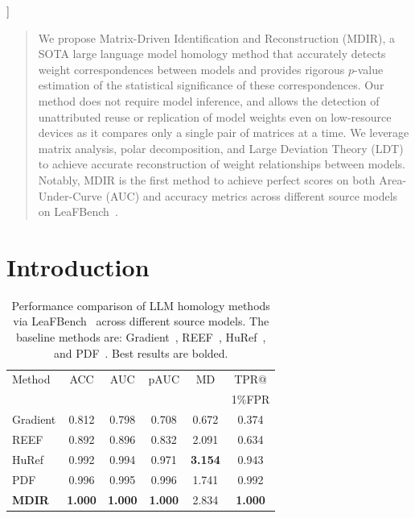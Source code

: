 \documentclass{article} %
\begin{document}
  \vskip 0.3in
]
\printAffiliationsAndNotice{}

\begin{abstract}
We propose Matrix-Driven Identification and Reconstruction (MDIR), a SOTA large language model homology method that accurately detects weight correspondences between models and provides rigorous $p$-value estimation of the statistical significance of these correspondences. Our method does not require model inference, and allows the detection of unattributed reuse or replication of model weights even on low-resource devices as it compares only a single pair of matrices at a time. We leverage matrix analysis, polar decomposition, and Large Deviation Theory (LDT) to achieve accurate reconstruction of weight relationships between models. Notably, MDIR is the first method to achieve perfect scores on both Area-Under-Curve (AUC) and accuracy metrics across different source models on LeaFBench~\citep{shao2025soklargelanguagemodel}.

\end{abstract}

\section{Introduction}

\begin{table}[h]
\centering
\caption{Performance comparison of LLM homology methods via LeaFBench~\citep{shao2025soklargelanguagemodel} across different source models. The baseline methods are: Gradient~\citep{wu2025gradientbasedmodelfingerprintingllm},  REEF~\citep{zhang2025reef}, HuRef~\citep{zeng2024huref}, and PDF~\citep{yoon2025intrinsicfingerprintllmscontinue}. Best results are bolded.}
\begin{adjustbox}{max width=1.0\columnwidth}
\begin{tabular}{lccccc}
\hline
Method & ACC & AUC  & pAUC & MD  & TPR@ \\
 &   &  &   &  & 1\%FPR \\
\hline
Gradient & 0.812 & 0.798 & 0.708 & 0.672 & 0.374 \\
REEF & 0.892 & 0.896 & 0.832 & 2.091 & 0.634 \\
HuRef & 0.992 & 0.994 & 0.971 & \textbf{3.154} & 0.943 \\
PDF & 0.996 & 0.995 & 0.996 & 1.741 & 0.992 \\
\textbf{MDIR} & \textbf{1.000} & \textbf{1.000}  & \textbf{1.000} & 2.834 & \textbf{1.000} \\
\hline
\end{tabular}
\end{adjustbox}

\end{table}
\end{document}
